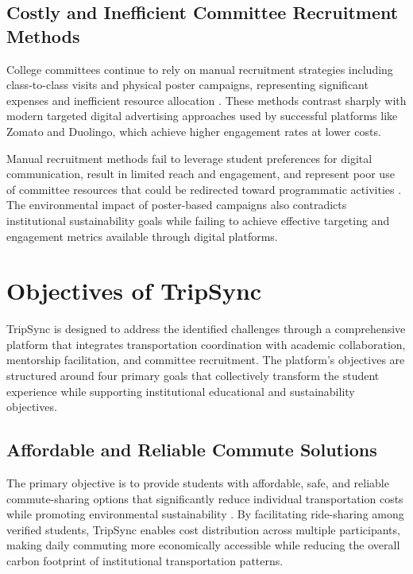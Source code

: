 \documentclass[conference]{IEEEtran}
\begin{document}
\subsection{Costly and Inefficient Committee Recruitment Methods}

College committees continue to rely on manual recruitment strategies including class-to-class visits and physical poster campaigns, representing significant expenses and inefficient resource allocation \cite{ref4}. These methods contrast sharply with modern targeted digital advertising approaches used by successful platforms like Zomato and Duolingo, which achieve higher engagement rates at lower costs.

Manual recruitment methods fail to leverage student preferences for digital communication, result in limited reach and engagement, and represent poor use of committee resources that could be redirected toward programmatic activities \cite{ref5}. The environmental impact of poster-based campaigns also contradicts institutional sustainability goals while failing to achieve effective targeting and engagement metrics available through digital platforms.

\section{Objectives of TripSync}

TripSync is designed to address the identified challenges through a comprehensive platform that integrates transportation coordination with academic collaboration, mentorship facilitation, and committee recruitment. The platform's objectives are structured around four primary goals that collectively transform the student experience while supporting institutional educational and sustainability objectives.

\subsection{Affordable and Reliable Commute Solutions}

The primary objective is to provide students with affordable, safe, and reliable commute-sharing options that significantly reduce individual transportation costs while promoting environmental sustainability \cite{ref6}\cite{ref7}. By facilitating ride-sharing among verified students, TripSync enables cost distribution across multiple participants, making daily commuting more economically accessible while reducing the overall carbon footprint of institutional transportation patterns.
\end{document}
